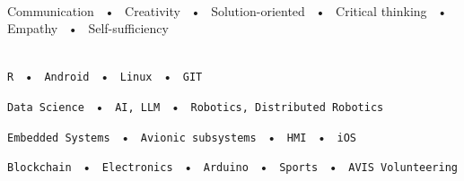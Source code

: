 \documentclass[lighthipster]{simplehipstercv}
\begin{document}
\begin{paracol}{2}
{    \bigskip
    
    \bigskip
    
    \\[0.5em]
    Communication ~•~ Creativity ~•~ Solution-oriented ~•~ Critical thinking ~•~ Empathy ~•~ Self-sufficiency

    \bigskip
    
    \\[0.5em]
    
    \texttt{R} ~•~ \texttt{Android} ~•~ \texttt{Linux} ~•~ \texttt{GIT}
    
    \texttt{Data Science} ~•~ \texttt{AI, LLM} ~•~ \texttt{Robotics, Distributed Robotics}
    
    \texttt{Embedded Systems} ~•~ \texttt{Avionic subsystems} ~•~ \texttt{HMI} ~•~ \texttt{iOS}

    \texttt{Blockchain} ~•~ \texttt{Electronics} ~•~ \texttt{Arduino} ~•~ \texttt{Sports} ~•~ \texttt{AVIS Volunteering} 
    
    \vspace{1em}
    
        
    
    }
    \switchcolumn %
    
    \begin{minipage}[t]{0.8\textwidth}

\end{minipage}
\end{paracol}
\end{document}
